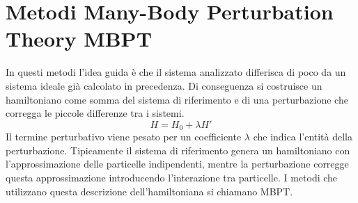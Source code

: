 \documentclass[oneside]{amsbook}
\numberwithin{section}{chapter}
\numberwithin{equation}{section}
\numberwithin{figure}{section}
\begin{document}
\section{Metodi Many-Body Perturbation Theory MBPT}
In questi metodi l'idea guida è che il sistema analizzato differisca di poco da un sistema ideale già calcolato in precedenza.
Di conseguenza si costruisce un hamiltoniano come somma del sistema di riferimento e di una perturbazione che corregga le piccole differenze tra i sistemi.
\begin{equation}
H=H_0+\lambda H'
\end{equation}
Il termine perturbativo viene pesato per un coefficiente $\lambda$ che indica l'entità della perturbazione.
Tipicamente il sistema di riferimento genera un hamiltoniano con l'approssimazione delle particelle indipendenti, mentre la perturbazione corregge questa approssimazione introducendo l'interazione tra particelle. I metodi che utilizzano questa descrizione dell'hamiltoniana si chiamano MBPT.
\end{document}
